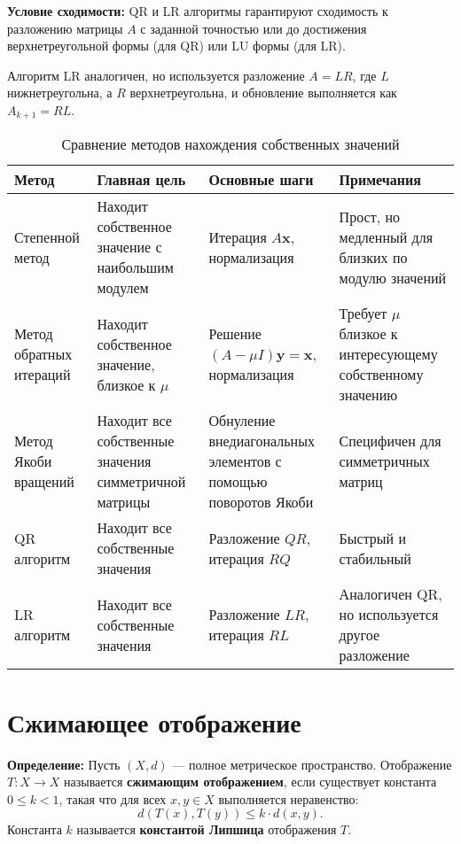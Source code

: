 \documentclass{article}
\begin{document}
\textbf{Условие сходимости:} QR и LR алгоритмы гарантируют сходимость к разложению матрицы \( A \) с заданной точностью или до достижения верхнетреугольной формы (для QR) или LU формы (для LR).


Алгоритм LR аналогичен, но используется разложение $A = L R$, где $L$ нижнетреугольна, а $R$ верхнетреугольна, и обновление выполняется как $A_{k+1} = R L$.

\begin{table}[h!]
    \centering
    \begin{tabular}{| m{3cm} | m{5cm} | m{4cm} | m{4cm} |}
        \hline
        \textbf{Метод} & \textbf{Главная цель} & \textbf{Основные шаги} & \textbf{Примечания} \\ 
        \hline
        Степенной метод & Находит собственное значение с наибольшим модулем & Итерация $A \mathbf{x}$, нормализация & Прост, но медленный для близких по модулю значений \\ 
        \hline
        Метод обратных итераций & Находит собственное значение, близкое к $\mu$ & Решение $(A - \mu I) \mathbf{y} = \mathbf{x}$, нормализация & Требует $\mu$ близкое к интересующему собственному значению \\ 
        \hline
        Метод Якоби вращений & Находит все собственные значения симметричной матрицы & Обнуление внедиагональных элементов с помощью поворотов Якоби & Специфичен для симметричных матриц \\ 
        \hline
        QR алгоритм & Находит все собственные значения & Разложение $QR$, итерация $R Q$ & Быстрый и стабильный \\ 
        \hline
        LR алгоритм & Находит все собственные значения & Разложение $LR$, итерация $R L$ & Аналогичен QR, но используется другое разложение \\ 
        \hline
    \end{tabular}
    \caption{Сравнение методов нахождения собственных значений}
\end{table}
\section{Сжимающее отображение}

\textbf{Определение:} Пусть \((X, d)\) — полное метрическое пространство. Отображение \(T: X \rightarrow X\) называется \textbf{сжимающим отображением}, если существует константа \(0 \leq k < 1\), такая что для всех \(x, y \in X\) выполняется неравенство:
\[ d(T(x), T(y)) \leq k \cdot d(x, y). \]
Константа \(k\) называется \textbf{константой Липшица} отображения \(T\).
\end{document}
